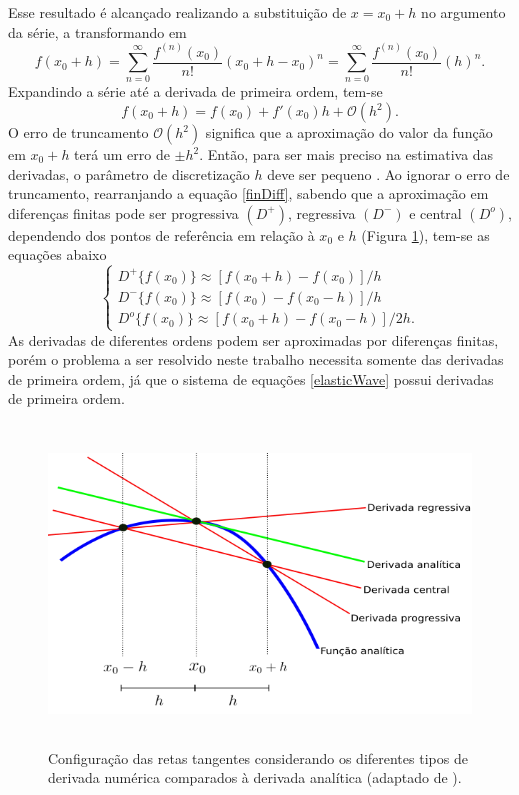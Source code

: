 \documentclass[
	12pt,				%
	openright,			%
	oneside,			%
	a4paper,			%
	english,			%
	brazil				%
	]{abntex2}
\begin{document}
	Esse resultado é alcançado realizando a substituição de $x = x_0+h$ no argumento da série, a transformando em
%
	\begin{equation}
		f(x_0 + h) = \displaystyle\sum_{n=0}^{\infty} \dfrac{f^{(n)} (x_0)}{n!}(x_0 + h - x_0)^n = \displaystyle\sum_{n=0}^{\infty} \dfrac{f^{(n)} (x_0)}{n!}(h)^n.
	\end{equation}
%
	\noindent Expandindo a série até a derivada de primeira ordem, tem-se	
%
	\begin{equation}
		f(x_0 + h) = f(x_0) + f'(x_0)h + \mathcal{O}(h^2).
		\label{finDiff}
	\end{equation}
%	
	O erro de truncamento $\mathcal{O}(h^2)$ significa que a aproximação do valor da função em $x_0+h$ terá um erro de $\pm h^2$. Então, para ser mais preciso na estimativa das derivadas, o parâmetro de discretização $h$ deve ser pequeno \cite{leveque1998finite}. Ao ignorar o erro de truncamento, rearranjando a equação \ref{finDiff}, sabendo que a aproximação em diferenças finitas pode ser progressiva $(D^+)$, regressiva $(D^-)$ e central $(D^o)$, dependendo dos pontos de referência em relação à $x_0$ e $h$ (Figura \ref{derivadas}), tem-se as equações abaixo 
%
	\begin{equation}
		\begin{cases}
			D^+\{f(x_0)\} \approx \left[f(x_0 + h) - f(x_0)\right] / h \\
			D^-\{f(x_0)\} \approx \left[f(x_0) - f(x_0 - h)\right] / h \\
			D^o\{f(x_0)\} \approx \left[f(x_0 + h) - f(x_0 - h)\right] / 2h. 
		\end{cases}
		\label{difMDF}
	\end{equation}
%
 	As derivadas de diferentes ordens podem ser aproximadas por diferenças finitas, porém o problema a ser resolvido neste trabalho necessita somente das derivadas de primeira ordem, já que o sistema de equações \ref{elasticWave} possui derivadas de primeira ordem. 
%
    \begin{figure}[htp!]
		\centering
		\includegraphics[width=13cm,height=8.5cm]{../imagens/derivadas.png}
		\caption{Configuração das retas tangentes considerando os diferentes tipos de derivada numérica comparados à derivada analítica (adaptado de ).}
		\label{derivadas}
	\end{figure}
\end{document}

